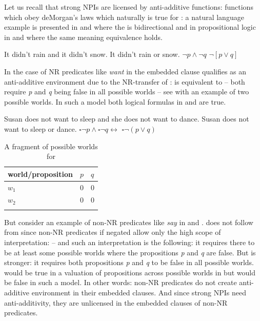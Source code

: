 \documentclass[output=paper, colorlinks, citecolor=brown, newtxmath]{langsci/langscibook}
\begin{document}
\noindent Let us recall that strong NPIs are licensed by anti-additive functions: functions which obey deMorgan's laws which naturally is true for : a natural language example is presented in  and  where the  is bidirectional and in propositional logic in  and  where the same meaning equivalence holds.

\ea \ea\label{ex-29-a} It didn't rain and it didn't snow.
\ex \label{ex-29-b} It didn't rain or snow.
\ex \label{ex-29-c} $\neg p \wedge \neg q$
\ex \label{ex-29-d} $\neg[p \vee q]$
\z
\z

\noindent In the case of NR predicates like \textit{want} in  the embedded clause qualifies as an anti-additive environment due to the NR-transfer of :  is equivalent to  -- both require \textit{p} and \textit{q} being false in all possible worlds -- see  with an example of two possible worlds. In such a model both logical formulas in  and  are true.

\ea \label{ex-30}\ea \label{ex-30-a} Susan does not want to sleep and she does not want to dance.
\ex \label{ex-30-b} Susan does not want to sleep or dance.
\ex \label{ex-30-c} $\square \neg p \wedge \square \neg q \leftrightarrow$
\ex \label{ex-30-d} $\square \neg(p \vee q)$
\z
\z

\begin{table}
\begin{tabularx}{0.4\textwidth}{lXX}
\lsptoprule
world/proposition & $p$ & $q$\tabularnewline
\midrule
$w_1$ & 0 & 0\tabularnewline
$w_2$ & 0 & 0\tabularnewline
\lspbottomrule
\end{tabularx}
\caption{A fragment of possible worlds for }
     \label{tab:table4_w1_w2}
\end{table}


\noindent But consider an example of non-NR predicates like \textit{say} in  and .  does not follow from   since non-NR predicates if negated allow only the high scope of  interpretation:  -- and such an interpretation is the following: it requires there to be at least some possible worlds where the propositions \textit{p} and \textit{q} are false. But  is stronger: it requires both propositions \textit{p} and \textit{q} to be false in all possible worlds.  would be true in a valuation of propositions across possible worlds in  but  would be false in such a model. In other words: non-NR predicates do not create anti-additive environment in their embedded clauses. And since strong NPIs need anti-additivity, they are unlicensed in the embedded clauses of non-NR predicates.
\end{document}
